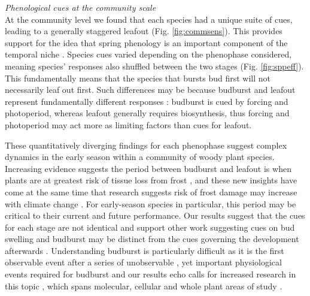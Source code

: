\documentclass[11pt]{article}
\begin{document}

\noindent \emph{Phenological cues at the community scale}\\
\noindent At the community level we found that each species had a unique suite of cues, leading to a generally staggered leafout (Fig. \ref{fig:commsens}). This provides support for the idea that spring phenology is an important component of the temporal niche \citep{gotelli1996,Loreau:2008xy}. Species cues varied depending on the phenophase considered, meaning species' responses also shuffled between the two stages (Fig. \ref{fig:sppeff}). This fundamentally means that the species that bursts bud first will not necessarily leaf out first. Such differences may be because budburst and leafout represent fundamentally different responses \citep{Basler:2014aa}: budburst is cued by forcing and photoperiod, whereas leafout generally requires biosynthesis, thus forcing and photoperiod may act more as limiting factors than cues for leafout. 

These quantitatively diverging findings for each phenophase suggest complex dynamics in the early season within a community of woody plant species. Increasing evidence suggests the period between budburst and leafout is when plants are at greatest risk of tissue loss from frost \citep{Lenz:2013aa}, and these new insights have come at the same time that research suggests risk of frost damage may increase with climate change \citep{Augspurger:2009gj,Dai2013}. For early-season species in particular, this period may be critical to their current and future performance. Our results suggest that the cues for each stage are not identical and support other work suggesting cues on bud swelling and budburst may be distinct from the cues governing the development afterwards \citep{Basler:2014aa}. Understanding budburst is particularly difficult as it is the first observable event after a series of unobservable \citep[but see][]{rinne2011}, yet important physiological events required for budburst \citep{Caffarra:2011aa,vitasse2014rev} and our results echo calls for increased research in this topic \citep{chuine2016}, which spans molecular, cellular and whole plant areas of study \citep{Morin:2009,rinne2011,singh2017}. 
\end{document}
